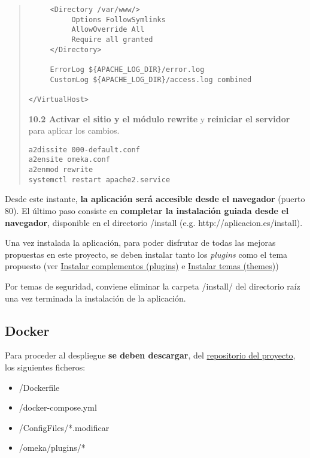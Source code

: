 \begin{enumerate}
\begin{quote}
\begin{verbatim}
     <Directory /var/www/>
          Options FollowSymlinks
          AllowOverride All
          Require all granted
     </Directory>

     ErrorLog ${APACHE_LOG_DIR}/error.log
     CustomLog ${APACHE_LOG_DIR}/access.log combined

</VirtualHost>
\end{verbatim}
\item
  \textbf{10.2 Activar el sitio y el módulo rewrite} y \textbf{reiniciar el
  servidor} para aplicar los cambios.
\begin{verbatim}
a2dissite 000-default.conf
a2ensite omeka.conf
a2enmod rewrite
systemctl restart apache2.service
\end{verbatim}
\end{quote}
\end{enumerate}

Desde este instante, \textbf{la aplicación será accesible desde el
navegador} (puerto 80). El último paso consiste en \textbf{completar la
instalación guiada desde el navegador}, disponible en el directorio
{/install} (e.g. {http://aplicacion.es/install}).

Una vez instalada la aplicación, para poder disfrutar de todas las
mejoras propuestas en este proyecto, se deben instalar tanto los
\emph{plugins} como el tema propuesto (ver
\protect\hyperlink{instalar-complementos-plugins}{Instalar complementos
(plugins)} e \protect\hyperlink{instalar-temas-themes}{Instalar temas
(themes)})

Por temas de seguridad, conviene eliminar la carpeta {/install/} del
directorio raíz una vez terminada la instalación de la aplicación.

\subsection{Docker}

Para proceder al despliegue \textbf{se deben descargar}, del
\href{https://github.com/gcm1001/TFG-CeniehAriadne}{repositorio del
proyecto}, los siguientes ficheros:

\begin{itemize}
\tightlist
\item
  {/Dockerfile}
\item
  {/docker-compose.yml}
\item
  {/ConfigFiles/*.modificar}
\item
  {/omeka/plugins/*}
\end{itemize}


